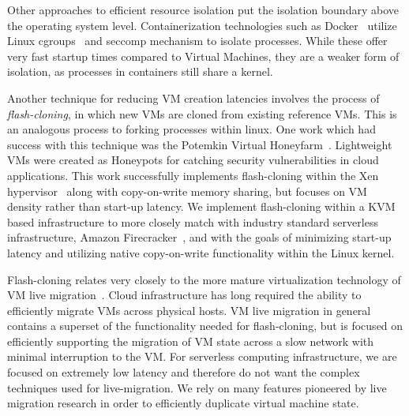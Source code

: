 Other approaches to efficient resource isolation put the isolation boundary
above the operating system level. Containerization technologies such as
Docker~\cite{docker} utilize Linux cgroups~\cite{cgroups} and seccomp mechanism
to isolate processes. While these offer very fast startup times compared to
Virtual Machines, they are a weaker form of isolation, as processes in
containers still share a kernel.

Another technique for reducing VM creation latencies involves the process of
\emph{flash-cloning}, in which new VMs are cloned from existing reference VMs.
This is an analogous process to forking processes within linux. One work which
had success with this technique was the Potemkin Virtual
Honeyfarm~\cite{potemkin}. Lightweight VMs were created as Honeypots for
catching security vulnerabilities in cloud applications. This work successfully
implements flash-cloning within the Xen hypervisor~\cite{xen} along with
copy-on-write memory sharing, but focuses on VM density rather than start-up
latency. We implement flash-cloning within a KVM based infrastructure to more
closely match with industry standard serverless infrastructure, Amazon
Firecracker~\cite{firecracker}, and with the goals of minimizing start-up
latency and utilizing native copy-on-write functionality within the Linux
kernel.

 Flash-cloning relates very closely to the more
mature virtualization technology of VM live
migration~\cite{post-copy-migration}\cite{snowflock}. Cloud infrastructure has
long required the ability to efficiently migrate VMs across physical hosts. VM
live migration in general contains a superset of the functionality needed for
flash-cloning, but is focused on efficiently supporting the migration of VM
state across a slow network with minimal interruption to the VM. For serverless
computing infrastructure, we are focused on extremely low latency and therefore
do not want the complex techniques used for live-migration. We rely on many
features pioneered by live migration research in order to efficiently duplicate
virtual machine state.
